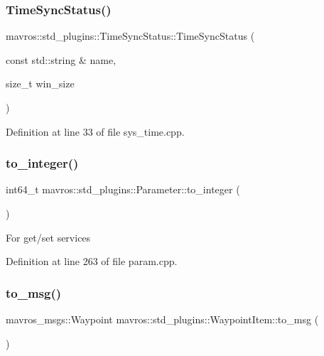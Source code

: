 \subsubsection{\texorpdfstring{TimeSyncStatus()}{TimeSyncStatus()}}
{\footnotesize\ttfamily mavros\+::std\+\_\+plugins\+::\+Time\+Sync\+Status\+::\+Time\+Sync\+Status (\begin{DoxyParamCaption}\item[{const std\+::string \&}]{name,  }\item[{size\+\_\+t}]{win\+\_\+size }\end{DoxyParamCaption})\hspace{0.3cm}{\ttfamily [inline]}}



Definition at line 33 of file sys\+\_\+time.\+cpp.

\mbox{\label{group__plugin_gae72d53f3c84fe6c018f95d55510f78b8}} 
\subsubsection{\texorpdfstring{to\_integer()}{to\_integer()}}
{\footnotesize\ttfamily int64\+\_\+t mavros\+::std\+\_\+plugins\+::\+Parameter\+::to\+\_\+integer (\begin{DoxyParamCaption}{ }\end{DoxyParamCaption})\hspace{0.3cm}{\ttfamily [inline]}}

For get/set services 

Definition at line 263 of file param.\+cpp.

\mbox{\label{group__plugin_ga5c25947a645ea543c7b198bb3c497ac9}} 
\subsubsection{\texorpdfstring{to\_msg()}{to\_msg()}}
{\footnotesize\ttfamily mavros\+\_\+msgs\+::\+Waypoint mavros\+::std\+\_\+plugins\+::\+Waypoint\+Item\+::to\+\_\+msg (\begin{DoxyParamCaption}{ }\end{DoxyParamCaption})\hspace{0.3cm}{\ttfamily [inline]}}



